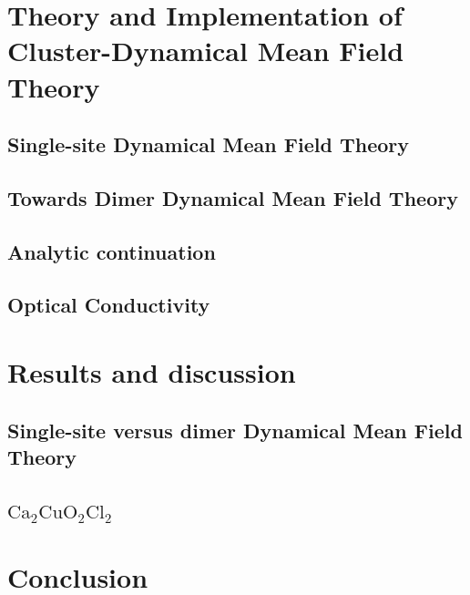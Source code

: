 \documentclass[12pt]{article}
\begin{document}
\section{Theory and Implementation of Cluster-Dynamical Mean Field Theory}
\subsection{Single-site Dynamical Mean Field Theory}

\subsection{Towards Dimer Dynamical Mean Field Theory}

\subsection{Analytic continuation}

\subsection{Optical Conductivity}

\section{Results and discussion}
\subsection{Single-site versus dimer Dynamical Mean Field Theory}

\subsection{$\mathrm{Ca_{2}CuO_{2}Cl_{2}}$}

\section{Conclusion}

\begin{multicols}{2}


\end{multicols}
\end{document}
